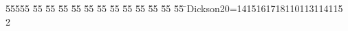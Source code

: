 %
%
\begin{tabbing}
55555 \= 55 \= 55 \= 55 \= 55 \= 55 \= 55 \= 55 \= 55 \= 55 \= 55 \= 55 \= 55 \= \>Dickson20=1415161718110113114115\\[0pt]
2\>\end{tabbing}
